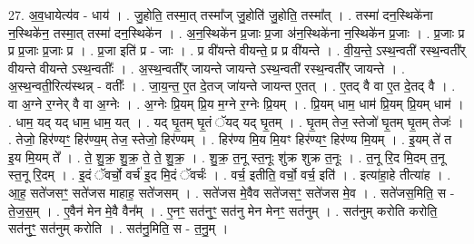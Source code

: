 \documentclass[17pt]{extarticle}
\begin{document}
27. अ॒व॒धायेत्य॑व - धाय॑ । . जु॒होति॒ तस्मा॒त् तस्मा᳚ज् जु॒होति॑ जु॒होति॒ तस्मा᳚त् । . तस्मा॑ दन॒स्थिके॑ना न॒स्थिके॑न॒ तस्मा॒त् तस्मा॑ दन॒स्थिके॑न । . अ॒न॒स्थिके॑न प्र॒जाः प्र॒जा अ॑न॒स्थिके॑ना न॒स्थिके॑न प्र॒जाः । . प्र॒जाः प्र प्र प्र॒जाः प्र॒जाः प्र । . प्र॒जा इति॑ प्र - जाः । . प्र वी॑यन्ते वीयन्ते॒ प्र प्र वी॑यन्ते । . वी॒य॒न्ते॒ ऽस्थ॒न्वती॑ रस्थ॒न्वती᳚र् वीयन्ते वीयन्ते ऽस्थ॒न्वतीः᳚ । . अ॒स्थ॒न्वती᳚र् जायन्ते जायन्ते ऽस्थ॒न्वती॑ रस्थ॒न्वती᳚र् जायन्ते । . अ॒स्थ॒न्वती॒रित्य॑स्थन्न् - वतीः᳚ । . जा॒य॒न्त॒ ए॒त दे॒तज् जा॑यन्ते जायन्त ए॒तत् । . ए॒तद् वै वा ए॒त दे॒तद् वै । . वा अ॒ग्ने र॒ग्नेर् वै वा अ॒ग्नेः । . अ॒ग्नेः प्रि॒यम् प्रि॒य म॒ग्ने र॒ग्नेः प्रि॒यम् । . प्रि॒यम् धाम॒ धाम॑ प्रि॒यम् प्रि॒यम् धाम॑ । . धाम॒ यद् यद् धाम॒ धाम॒ यत् । . यद् घृ॒तम् घृ॒तं ॅयद् यद् घृ॒तम् । . घृ॒तम् तेज॒ स्तेजो॑ घृ॒तम् घृ॒तम् तेजः॑ । . तेजो॒ हिर॑ण्यꣳ॒॒ हिर॑ण्य॒म् तेज॒ स्तेजो॒ हिर॑ण्यम् । . हिर॑ण्य मि॒य मि॒यꣳ हिर॑ण्यꣳ॒॒ हिर॑ण्य मि॒यम् । . इ॒यम् ते॑ त इ॒य मि॒यम् ते᳚ । . ते॒ शु॒क्र॒ शु॒क्र॒ ते॒ ते॒ शु॒क्र॒ । . शु॒क्र॒ त॒नू स्त॒नूः शु॑क्र शुक्र त॒नूः । . त॒नू रि॒द मि॒दम् त॒नू स्त॒नू रि॒दम् । . इ॒दं ॅवर्चो॒ वर्च॑ इ॒द मि॒दं ॅवर्चः॑ । . वर्च॒ इतीति॒ वर्चो॒ वर्च॒ इति॑ । . इत्या॑हा॒हे तीत्या॑ह । . आ॒ह॒ सते॑जसꣳ॒॒ सते॑जस माहाह॒ सते॑जसम् । . सते॑जस मे॒वैव सते॑जसꣳ॒॒ सते॑जस मे॒व । . सते॑जस॒मिति॒ स - ते॒ज॒स॒म् । . ए॒वैन॑ मेन मे॒वै वैन᳚म् । . ए॒नꣳ॒॒ सत॑नुꣳ॒॒ सत॑नु मेन मेनꣳ॒॒ सत॑नुम् । . सत॑नुम् करोति करोति॒ सत॑नुꣳ॒॒ सत॑नुम् करोति । . सत॑नु॒मिति॒ स - त॒नु॒म् । \newline
\end{document}
